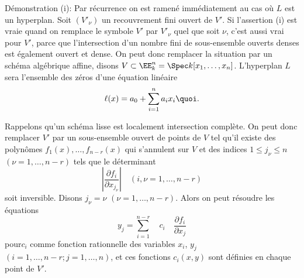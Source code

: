 \documentclass[10pt]{../fichiers-configuration-latex/smfart}
\begin{document}
Démonstration (i): Par récurrence on est ramené immédiatement au cas
où $L$ est un hyperplan. Soit $(V'_{\nu})$ un recouvrement fini ouvert de
$V'$. Si l'assertion (i) est vraie quand on remplace le symbole $V'$
par $V'_{\nu}$ quel que soit $\nu$, c'est aussi vrai pour $V'$, parce
que l'intersection d'un nombre fini de sous-ensemble ouverts denses
est également ouvert et dense. On peut donc remplacer la situation par
un schéma algébrique affine, disons $V\subset \EE^n_k=\Spec
k[x_1,\ldots,x_n]$. L'hyperplan $L$ sera l'ensemble des zéros d'une
équation linéaire
$$
\ell(x)=a_0+\sum^n_{i=1}a_ix_i{\quoi}.
$$

Rappelons qu'un schéma lisse est localement intersection complète. On
peut donc remplacer $V'$ par un sous-ensemble ouvert de points de $V$
tel qu'il existe des polynômes $f_1(x),\ldots,f_{n-r}(x)$ qui
s'annulent sur $V$ et des indices $1\leq j_{\nu}\leq n$
$(\nu=1,\ldots,n-r)$ tels que le déterminant
$$
\left|\frac{\partial f_i}{\partial x_{j_{\nu}}}\right|\quad 
(i,\nu=1,\ldots,n-r)
$$
soit inversible. Disons $j_{\nu}=\nu$ $(\nu=1,\ldots,n-r)$. Alors on peut
résoudre les équations
$$
y_j=\sum^{n-r}_{i=1}\quad c_i\quad \frac{\partial f_i}{\partial x_j}
$$
pour\pageoriginale $c_i$ comme fonction rationnelle des variables $x_i$, $y_j$
$(i=1,\ldots, n-r; j=1,\ldots,n)$, et ces fonctions $c_i(x,y)$ sont
définies en chaque point de $V'$.
\end{document}
